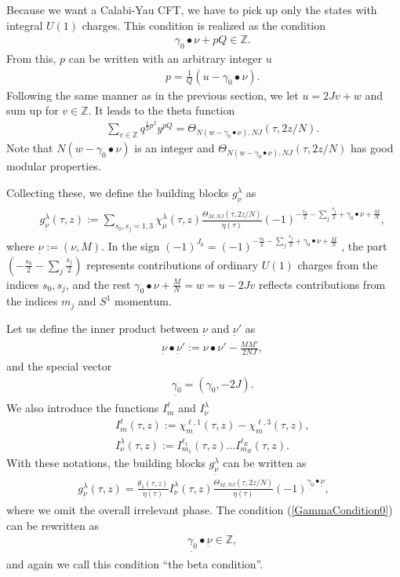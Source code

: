 \documentclass[a4paper,12pt]{article}
\numberwithin{equation}{section}
\newcommand{\Th}{\Theta}
\newcommand{\Zb}{{\mathbb Z}}
\newcommand{\nt}{\underset{\widetilde{}}{\nu}}
\newcommand{\gt}{\underset{\widetilde{}}{\gamma_{0}}}
\begin{document}
Because we want a Calabi-Yau CFT, we have to pick up only the states with
integral $U(1)$ charges. This condition is realized as the condition
\begin{eqnarray}
 && \gamma_0\bullet\nu+pQ \in \Zb. \label{GammaCondition0}
\end{eqnarray}
From this, $p$ can be written with an arbitrary
integer $u$
\begin{eqnarray*}
 && p=\frac 1Q \left(u-\gamma_0\bullet\nu\right).
\end{eqnarray*}
Following the same manner as in the previous section, 
we let $u=2Jv+w$ and sum up for $v\in\Zb$. It leads to the
theta function
\begin{eqnarray*}
 &&\sum_{v\in\Zb}q^{\frac12p^2}y^{pQ}=
\Th_{N(w-\gamma_0\bullet\nu),NJ}(\tau,2z/N).
\end{eqnarray*}
Note that $N(w-\gamma_0\bullet\nu)$ is an integer and
$\Th_{N(w-\gamma_0\bullet\nu),NJ}(\tau,2z/N)$ has good modular
properties.

Collecting these, we define the building blocks $g_{\nt}^{\lambda}$ as
\begin{eqnarray*}
 && g_{\nt}^{\lambda}(\tau,z):=\sum_{s_0,s_j=1,3}
\chi_{\mu}^{\lambda}(\tau,z)
\frac{\Th_{M,NJ}(\tau,2z/N)}{\eta(\tau)}
(-1)^{-\frac{s_0}{2}-\sum_j\frac{s_j}{2}
+\gamma_0\bullet\nu+\frac{M}{N}},
\end{eqnarray*}
where $\nt:=(\nu,M)$. In the sign
 $(-1)^{J_0}=(-1)^{-\frac{s_0}{2}-\sum_j\frac{s_j}{2}
+\gamma_0\bullet\nu+\frac{M}{N}}$ , the part
 $(-\frac{s_0}{2}-\sum_j\frac{s_j}{2})$ represents contributions 
of ordinary $U(1)$ charges
 from the indices $s_0,s_j$, and the rest
 $\gamma_0\bullet\nu+\frac{M}{N}=w=u-2Jv$ reflects contributions from
the indices $m_j$ and $S^1$ momentum.

Let us define the inner product between $\nt$ and $\nt'$ as
\begin{eqnarray*}
 && \nt\bullet\nt':=\nu\bullet\nu'-\frac{MM'}{2NJ},
\end{eqnarray*}
and the special vector
\begin{eqnarray*}
 && \gt=(\gamma_0,-2J).
\end{eqnarray*}
We also introduce the functions $I_{m}^{\ell}$ and $I_{\nu}^{\lambda}$
\begin{eqnarray*}
 && I_{m}^{\ell}(\tau,z):=\chi_{m}^{\ell,1}(\tau,z)
-\chi_{m}^{\ell,3}(\tau,z),\\
 && I_{\nu}^{\lambda}(\tau,z):=I_{m_1}^{\ell_1}(\tau,z)
\dots I_{m_R}^{\ell_R}(\tau,z).
\end{eqnarray*}
With these notations, the building blocks $g_{\nt}^{\lambda}$ can be
written as
\begin{eqnarray*}
 g_{\nt}^{\lambda}(\tau,z)
=\frac{\theta_1(\tau,z)}{\eta(\tau)}I_{\nu}^{\lambda}(\tau,z)
\frac{\Th_{M,NJ}(\tau,2z/N)}{\eta(\tau)}(-1)^{\gt\bullet\nt},
\end{eqnarray*}
where we omit the overall irrelevant phase.
The condition (\ref{GammaCondition0}) can be rewritten as
\begin{eqnarray}
 && \gt\bullet\nt\in \Zb,\label{GammaCondition}
\end{eqnarray}
and again we call this condition ``the beta condition''.
\end{document}
